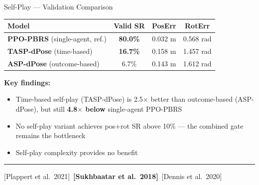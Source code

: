 \documentclass[aspectratio=169,xcolor=dvipsnames,t]{beamer}
\newcommand{\litfooter}[1]{%
  \vspace{2pt}%
  \hrule%
  \vspace{2pt}%
  {\tiny\color{LightDarkGrey} #1}%
}
\begin{document}
\begin{frame}[t]{Self-Play — Validation Comparison}
  \begin{center}
  \begin{tabular}{lccc}
    \toprule
    \textbf{Model} & \textbf{Valid SR} & \textbf{PosErr} & \textbf{RotErr} \\
    \midrule
    \rowcolor{hlgreen!15}
    \textbf{PPO-PBRS} (single-agent, ref.) & \textbf{80.0\%} & 0.032 m & 0.568 rad \\
    \midrule
    \textbf{TASP-dPose} (time-based) & \textbf{16.7\%} & 0.158 m & 1.457 rad \\
    \textbf{ASP-dPose} (outcome-based) & 6.7\% & 0.143 m & 1.612 rad \\
    \bottomrule
  \end{tabular}
  \end{center}

  \vspace{4pt}
  {\small \textbf{Key findings:}}
  \begin{itemize}
    \item Time-based self-play (TASP-dPose) is 2.5$\times$ better than outcome-based (ASP-dPose), but still \textbf{4.8$\times$ below} single-agent PPO-PBRS
    \item No self-play variant achieves pos+rot SR above 10\% — the combined gate remains the bottleneck
    \item Self-play complexity provides no benefit

  \end{itemize}

  \vfill\litfooter{[Plappert et al.\ 2021]~\textbf{[Sukhbaatar et al.\ 2018]}~[Dennis et al.\ 2020]}
\end{frame}

\end{document}
